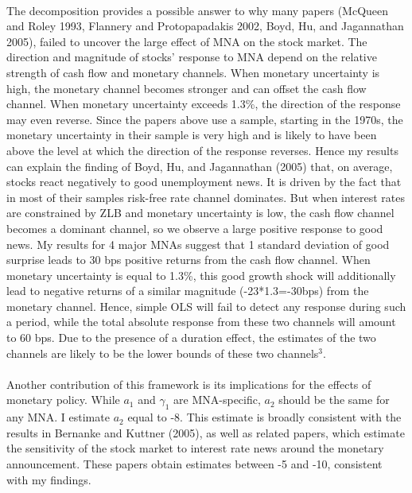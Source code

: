 \documentclass[12pt]{article}
\begin{document}
\paragraph{}
The decomposition provides a possible answer to why many papers (McQueen and Roley 1993, Flannery and Protopapadakis 2002, Boyd, Hu, and Jagannathan 2005), failed to uncover the large effect of MNA on the stock market. The direction and magnitude of stocks' response to MNA depend on the relative strength of cash flow and monetary channels. When monetary uncertainty is high, the monetary channel becomes stronger and can offset the cash flow channel. When monetary uncertainty exceeds 1.3\%, the direction of the response may even reverse. Since the papers above use a sample, starting in the 1970s, the monetary uncertainty in their sample is very high and is likely to have been above the level at which the direction of the response reverses. Hence my results can explain the finding of Boyd, Hu, and Jagannathan (2005) that, on average, stocks react negatively to good unemployment news. It is driven by the fact that in most of their samples risk-free rate channel dominates. But when interest rates are constrained by ZLB and monetary uncertainty is low, the cash flow channel becomes a dominant channel, so we observe a large positive response to good news. My results for 4 major MNAs suggest that 1 standard deviation of good surprise leads to 30 bps positive returns from the cash flow channel. When monetary uncertainty is equal to 1.3\%, this good growth shock will additionally lead to negative returns of a similar magnitude (-23*1.3=-30bps) from the monetary channel. Hence, simple OLS will fail to detect any response during such a period, while the total absolute response from these two channels will amount to 60 bps. Due to the presence of a duration effect, the estimates of the two channels are likely to be the lower bounds of these two channels$^3$. 
\paragraph{}
Another contribution of this framework is its implications for the effects of monetary policy. While ${a}_1$ and $\gamma_1$ are MNA-specific, $a_2$ should be the same for any MNA. I estimate ${a}_2$ equal to -8. This estimate is broadly consistent with the results in Bernanke and Kuttner (2005), as well as related papers, which estimate the sensitivity of the stock market to interest rate news around the monetary announcement. These papers obtain estimates between -5 and -10, consistent with my findings.
\end{document}

